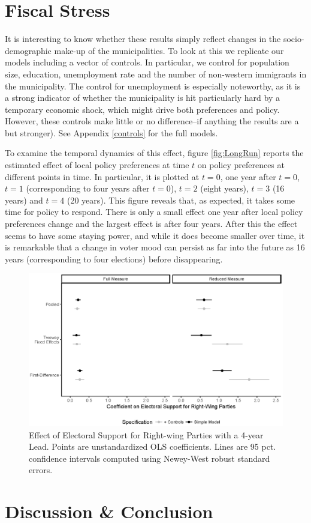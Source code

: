 \documentclass[a4paper,12pt]{article}
\begin{document}
\section{Fiscal Stress}
It is interesting to know whether these results simply reflect changes in the socio-demographic make-up of the municipalities. To look at this we replicate our models including a vector of controls. In particular, we control for population size, education, unemployment rate and the number of non-western immigrants in the municipality. The control for unemployment is especially noteworthy, as it is a strong indicator of whether the municipality is hit particularly hard by a temporary economic shock, which might drive both preferences and policy. However, these controls make little or no difference--if anything the results are a but stronger). See Appendix \ref{controls} for the full models. 


To examine the temporal dynamics of this effect, figure \ref{fig:LongRun} reports the estimated effect of local policy preferences at time $t$ on policy preferences at different points in time. In particular, it is plotted at $t=0$, one year after $t=0$, $t=1$ (corresponding to four years after $t=0$), $t=2$ (eight years), $t=3$ (16 years) and $t=4$ (20 years). This figure reveals that, as expected, it takes some time for policy to respond. There is only a small effect one year after local policy preferences change and the largest effect is  after four years. After this the effect seems to have some staying power, and while it does become smaller over time, it is remarkable that a change in voter mood can persist as far into the future as 16 years (corresponding to four elections) before disappearing.

\begin{figure}[h]
	\centering
	\includegraphics[scale = 0.8]{coef_11092018.eps}
	\caption{Effect of Electoral Support for Right-wing Parties with a 4-year Lead. Points are unstandardized OLS coefficients. Lines are 95 pct. confidence intervals computed using Newey-West robust standard errors.}
	\label{fig:FourYearLead}
\end{figure}
\section*{Discussion \& Conclusion}



\onehalfspacing



\clearpage

\renewcommand{\thesubsection}{\Alph{subsection}}
\renewcommand{\thetable}{\Alph{subsection}\arabic{table}}
\renewcommand{\thefigure}{\Alph{subsection}\arabic{figure}}
\end{document}
